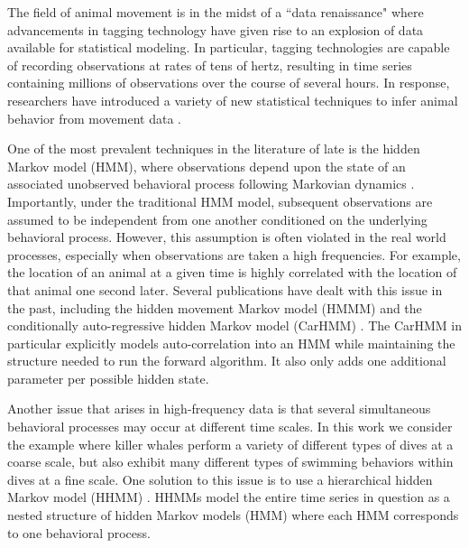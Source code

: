 

The field of animal movement is in the midst of a ``data renaissance" where advancements in tagging technology have given rise to an explosion of data available for statistical modeling. In particular, tagging technologies are capable of recording observations at rates of tens of hertz, resulting in time series containing millions of observations over the course of several hours. In response, researchers have introduced a variety of new statistical techniques to infer animal behavior from movement data \citep{Hooten:2017}. 

One of the most prevalent techniques in the literature of late is the hidden Markov model (HMM), where observations depend upon the state of an associated unobserved behavioral process following Markovian dynamics \citep{Patterson:2017}. Importantly, under the traditional HMM model, subsequent observations are assumed to be independent from one another conditioned on the underlying behavioral process. However, this assumption is often violated in the real world processes, especially when observations are taken a high frequencies. For example, the location of an animal at a given time is highly correlated with the location of that animal one second later. Several publications have dealt with this issue in the past, including the hidden movement Markov model (HMMM) \citep{Whoriskey:2016} and the conditionally auto-regressive hidden Markov model (CarHMM) \citep{Lawler:2019}. The CarHMM in particular explicitly models auto-correlation into an HMM while maintaining the structure needed to run the forward algorithm. It also only adds one additional parameter per possible hidden state.

Another issue that arises in high-frequency data is that several simultaneous behavioral processes may occur at different time scales. In this work we consider the example where killer whales perform a variety of different types of dives at a coarse scale, but also exhibit many different types of swimming behaviors within dives at a fine scale. One solution to this issue is to use a hierarchical hidden Markov model (HHMM) \citep{Barajas:2017} \citep{Adam:2019}. HHMMs model the entire time series in question as a nested structure of hidden Markov models (HMM) where each HMM corresponds to one behavioral process.

